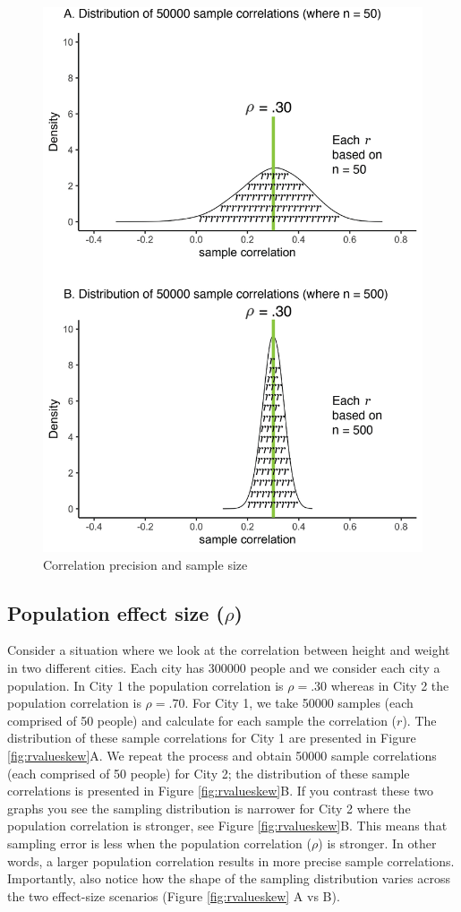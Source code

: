 \documentclass[
]{krantz}
\begin{document}
\begin{figure}
\includegraphics[width=0.8\linewidth]{ch_samples_precision/images/r_sampling_dist_n_vary} \caption{Correlation precision and sample size}\label{fig:rvaluen}
\end{figure}

\hypertarget{population-effect-size-rho}{%
\subsection{\texorpdfstring{Population effect size (\(\rho\))}{Population effect size (\textbackslash rho)}}\label{population-effect-size-rho}}

Consider a situation where we look at the correlation between height and weight in two different cities. Each city has 300000 people and we consider each city a population.
In City 1 the population correlation is \(\rho = .30\) whereas in City 2 the population correlation is \(\rho = .70\). For City 1, we take 50000 samples (each comprised of 50 people) and calculate for each sample the correlation (\(r\)). The distribution of these sample correlations for City 1 are presented in Figure \ref{fig:rvalueskew}A. We repeat the process and obtain 50000 sample correlations (each comprised of 50 people) for City 2; the distribution of these sample correlations is presented in Figure \ref{fig:rvalueskew}B. If you contrast these two graphs you see the sampling distribution is narrower for City 2 where the population correlation is stronger, see Figure \ref{fig:rvalueskew}B. This means that sampling error is less when the population correlation (\(\rho\)) is stronger. In other words, a larger population correlation results in more precise sample correlations. Importantly, also notice how the shape of the sampling distribution varies across the two effect-size scenarios (Figure \ref{fig:rvalueskew} A vs B).
\end{document}
